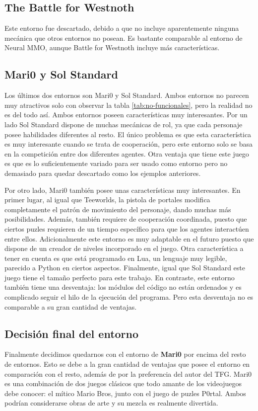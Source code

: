 \subsection{The Battle for Westnoth}

Este entorno fue descartado, debido a que no incluye aparentemente ninguna mecánica que otros entornos no posean. Es bastante comparable al entorno de Neural MMO, aunque Battle for  Westnoth incluye más características.

\subsection{Mari0 y Sol Standard}

Los últimos dos entornos son Mari0 y Sol Standard. Ambos entornos no parecen muy atractivos solo con observar la tabla \ref{tab:no-funcionales}, pero la realidad no es del todo así. Ambos entornos poseen características muy interesantes. Por un lado Sol Standard dispone de muchas mecánicas de rol, ya que cada personaje posee habilidades diferentes al resto. El único problema es que esta característica es muy interesante cuando se trata de cooperación, pero este entorno solo se basa en la competición entre dos diferentes agentes. Otra ventaja que tiene este juego es que es lo suficientemente variado para ser usado como entorno pero no demasiado para quedar descartado como los ejemplos anteriores.  

\par Por otro lado, Mari0 también posee unas características muy interesantes. En primer lugar, al igual que Teeworlds, la pistola de portales modifica completamente el patrón de movimiento del personaje, dando muchas más posibilidades. Además, también requiere de cooperación coordinada, puesto que ciertos puzles requieren de un tiempo específico para que los agentes interactúen entre ellos. Adicionalmente este entorno es muy adaptable en el futuro puesto que dispone de un creador de niveles incorporado en el juego. Otra característica a tener en cuenta es que está programado en Lua, un lenguaje muy legible, parecido a Python en ciertos aspectos. Finalmente, igual que Sol Standard este juego tiene el tamaño perfecto para este trabajo. En contraste, este entorno también tiene una desventaja: los módulos del código no están ordenados y es complicado seguir el hilo de la ejecución del programa. Pero esta desventaja no es comparable a su gran cantidad de ventajas.

\subsection{Decisión final del entorno}

Finalmente decidimos quedarnos con el entorno de \textbf{Mari0} por encima del resto de entornos. Esto se debe a la gran cantidad de ventajas que posee el entorno en comparación con el resto, además de por la preferencia del autor del TFG. Mari0 es una combinación de dos juegos clásicos que todo amante de los videojuegos debe conocer: el mítico Mario Bros, junto con el juego de puzles P0rtal. Ambos podrían considerarse obras de arte y su mezcla es realmente divertida.
